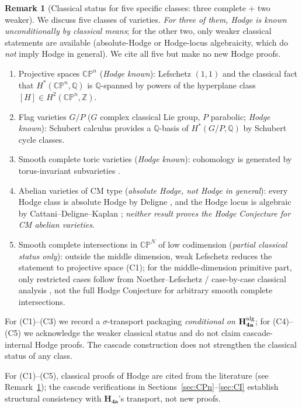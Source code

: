 \documentclass[11pt, a4paper]{amsart}
\theoremstyle{definition}
\newtheorem{remark}[theorem]{Remark}
\newcommand{\Q}{\mathbb{Q}}
\newcommand{\Z}{\mathbb{Z}}
\newcommand{\CP}{\mathbb{CP}}
\begin{document}
\begin{remark}[Classical status for five specific classes:
  three complete + two weaker]
\label{rmk:classical-classes}
We discuss five classes of varieties. \emph{For three of them,
Hodge is known unconditionally by classical means}; for the other
two, only weaker classical statements are available
(absolute-Hodge or Hodge-locus algebraicity, which do \emph{not}
imply Hodge in general). We cite all five but make no new Hodge
proofs.
\begin{enumerate}
\item[(C1)] Projective spaces $\CP^n$ (\emph{Hodge known}):
  Lefschetz $(1, 1)$ \cite{Lefschetz1924} and the classical
  fact that $H^*(\CP^n, \Q)$ is $\Q$-spanned by powers of the
  hyperplane class $[H] \in H^2(\CP^n, \Z)$.
\item[(C2)] Flag varieties $G/P$ ($G$ complex classical Lie
  group, $P$ parabolic; \emph{Hodge known}): Schubert calculus
  provides a $\Q$-basis of $H^*(G/P, \Q)$ by Schubert cycle
  classes.
\item[(C3)] Smooth complete toric varieties (\emph{Hodge known}):
  cohomology is generated by torus-invariant subvarieties
  \cite[\S 12]{Danilov1978}.
\item[(C4)] Abelian varieties of CM type (\emph{absolute Hodge,
  not Hodge in general}): every Hodge class is absolute Hodge by
  Deligne \cite{Deligne1982}, and the Hodge locus is algebraic by
  Cattani--Deligne--Kaplan \cite{CDK1995}; \emph{neither result
  proves the Hodge Conjecture for CM abelian varieties}.
\item[(C5)] Smooth complete intersections in $\CP^N$ of low
  codimension (\emph{partial classical status only}):
  outside the middle dimension, weak Lefschetz reduces the
  statement to projective space (C1); for the middle-dimension
  primitive part, only restricted cases follow from
  Noether--Lefschetz / case-by-case classical analysis
  \cite{Voisin2002}, not the full Hodge Conjecture for arbitrary
  smooth complete intersections.
\end{enumerate}
For (C1)--(C3) we record a $\sigma$-transport packaging
\emph{conditional on $\mathbf{H_{4a}^{\rm alg}}$}; for (C4)--(C5)
we acknowledge the weaker classical status and do not claim
cascade-internal Hodge proofs. The cascade construction does not
strengthen the classical status of any class.
\end{remark}

For (C1)--(C5), classical proofs of Hodge are cited from the
literature (see Remark~\ref{rmk:classical-classes}); the cascade
verifications in Sections~\ref{sec:CPn}--\ref{sec:CI} establish
structural consistency with $\mathbf{H_{4a}}$'s transport, not new
proofs.
\end{document}

